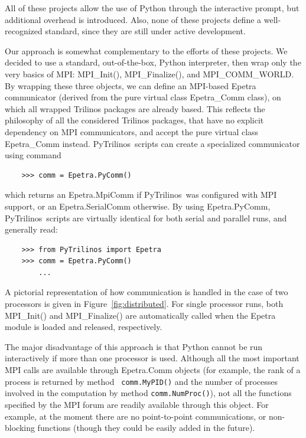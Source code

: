 \documentclass[acmtocl]{acmtrans2m}
\newcommand{\PyTrilinos}{{PyTrilinos}}
\begin{document}
All of these projects allow the use of Python through the interactive
prompt, but additional overhead is introduced.  Also, none of these
projects define a well-recognized standard, since they are still under
active development.

Our approach is somewhat complementary to the efforts of these
projects.  We decided to use a standard, out-of-the-box, Python
interpreter, then wrap only the very basics of MPI: MPI\_Init(),
MPI\_Finalize(), and MPI\_COMM\_WORLD.  By wrapping these three
objects, we can define an MPI-based Epetra communicator (derived from
the pure virtual class Epetra\_Comm class), on which all wrapped
Trilinos packages are already based.  This reflects the philosophy of
all the considered Trilinos packages, that have no explicit dependency
on MPI communicators, and accept the pure virtual class Epetra\_Comm
instead.  \PyTrilinos\ scripts can create a specialized communicator
using command
\begin{verbatim}
    >>> comm = Epetra.PyComm()
\end{verbatim}
which returns an Epetra.MpiComm if \PyTrilinos\ was configured with
MPI support, or an Epetra.SerialComm otherwise.  By using
Epetra.PyComm, \PyTrilinos\ scripts are virtually identical for both
serial and parallel runs, and generally read:
\begin{verbatim}
    >>> from PyTrilinos import Epetra
    >>> comm = Epetra.PyComm()
        ...
\end{verbatim}
A pictorial representation of how communication is handled in the
case of two processors is given in Figure~\ref{fig:distributed}. For
single processor runs, both MPI\_Init() and MPI\_Finalize() are
automatically called when the Epetra module is loaded and released,
respectively.

\smallskip

The major disadvantage of this approach is that Python cannot be run
interactively if more than one processor is used.  Although all the
most important MPI calls are available through Epetra.Comm objects
(for example, the rank of a process is returned by method {\tt
  comm.MyPID()} and the number of processes involved in the
computation by method {\tt comm.NumProc()}), not all the functions
specified by the MPI forum are readily available through this object.
For example, at the moment there are no point-to-point communications,
or non-blocking functions (though they could be easily added in the
future).
\end{document}
